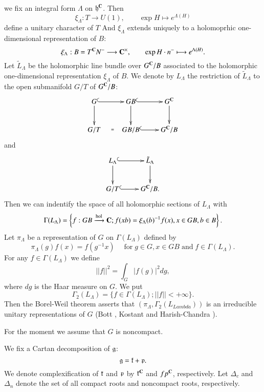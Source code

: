 we fix an integral form $\Lambda$ on $\mathfrak{h}^{\mathbf{C}}$. Then
$$
\xi_{\Lambda} : T \longrightarrow U(1), \qquad \exp H \longmapsto e^{\Lambda(H)} 
$$ 
define a unitary character of $T$ And $\xi_{\Lambda}$ extends uniquely to a holomoprhic one-dimensional representation of $B$:
$$
\xi_{\Lambda}: B = T^{\mathbf{C}}N^{-} \longrightarrow \mathbf{C}^{\times}, \qquad \exp H \cdot n^{-} \longmapsto e^{\Lambda(H)}.
$$
Let $\tilde{L}_{\Lambda}$ be the holomorphic line bundle over $G^{\mathbf{C}}/B$ associated to the holomorphic one-dimensional representation $\xi_{\Lambda}$ of $B$. We denote by $L_{\Lambda}$ the restriction of $\tilde{L}_{\Lambda}$ to the open submanifold $G/T$ of $G^{\mathbf{C}}/B$:
$$
\xymatrix{
G \ar[d]\ar@{^{(}->}[r] & GB \ar[d] \ar@{^{(}->}[r] & G^{\bC}\ar[d]\\
G/T \ar@{}[r]|{=} & GB/B \ar@{^{(}->}[r] & G^{\bC}/B
}
$$
and
$$
\xymatrix{
L_{\Lambda}\ar[d]\ar@{^{(}->}[r]& \tilde{L}_{\Lambda}\ar[d]\\
G/T \ar@{^{(}->}[r] & G^{\bC}/B.
}
$$
Then we can indentify the space of all holomorphic sections of $L_{\Lambda}$ with
$$
\Gamma(L_{\Lambda})= \left\{f : GB \xrightarrow{\operatorname{hol}}\mathbf{C} ; f(xb) = \xi_{\Lambda}(b)^{-1}f(x), x \in GB, b\in B \right\}.
$$
Let $\pi_{\Lambda}$ be a representation of $G$ on $\Gamma(L_{\Lambda})$ defined by
$$
\pi_{\Lambda} (g)f(x)= f(g^{-1}x) \quad \;\text{for}\; g \in G, x \in GB\; \text{and}\; f \in \Gamma(L_{\Lambda}).
$$
For any $f \in \Gamma(L_{\Lambda})$ we define
$$
||f||^{2} = \int_{G} |f(g)|^{2}dg,
$$
where $dg$ is the Haar measure on $G$. We put
$$
\Gamma_{2}(L_{\Lambda})= \{f \in \Gamma (L_{\Lambda}); ||f|| < + \infty\}.
$$
Then the Borel-Weil theorem asserts that $(\pi_{\Lambda}, \Gamma_{2}(L_{Lambda}))$ is an irreducible unitary representations of $G$ (Bott \cite{art15-key1}, Kostant \cite{art15-key8} and Harish-Chandra \cite{art15-key2} \cite{art15-key3} \cite{art15-key4}).

For the moment we assume that $G$ is noncompact.

We fix a Cartan decomposition of $\mathfrak{g}$:
$$
\mathfrak{g} = \mathfrak{k} + \mathfrak{p}.
$$
We denote complexification of $\mathfrak{k}$ and $\mathfrak{p}$ by $\mathfrak{k}^{\mathbf{C}}$ and $fp^{\mathbf{C}}$, respectively. Let $\Delta_{c}$ and $\Delta_{n}$ denote the set of all compact roots and noncompact roots, respectively.

